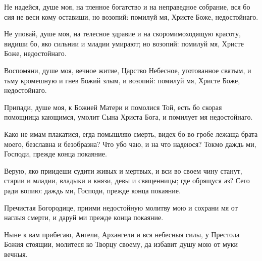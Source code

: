 \begin{mymulticols}
Не надейся, душе моя, на тленное богатство и на неправедное собрание, вся бо сия не веси кому оставиши, но возопий: помилуй мя, Христе Боже, недостойнаго.


Не уповай, душе моя, на телесное здравие и на скоромимоходящую красоту, видиши бо, яко сильнии и младии умирают; но возопий: помилуй мя, Христе Боже, недостойнаго.

\slava

Воспомяни, душе моя, вечное житие, Царство Небесное, уготованное святым, и тьму кромешную и гнев Божий злым, и возопий: помилуй мя, Христе Боже, недостойнаго.

\inyne

Припади, душе моя, к Божией Матери и помолися Той, есть бо скорая помощница кающимся, умолит Сына Христа Бога, и помилует мя недостойнаго.




Како не имам плакатися, егда помышляю смерть, видех бо во гробе лежаща брата моего, безславна и безобразна? Что убо чаю, и на что надеюся? Токмо даждь ми, Господи, прежде конца покаяние. 

\slava

Верую, яко приидеши судити живых и мертвых, и вси во своем чину станут, старии и младии, владыки и князи, девы и священницы; где обрящуся аз? Сего ради вопию: даждь ми, Господи, прежде конца покаяние.

\inyne

Пречистая Богородице, приими недостойную молитву мою и сохрани мя от наглыя смерти, и даруй ми прежде конца покаяние.




Ныне к вам прибегаю, Ангели, Архангели и вся небесныя силы, у Престола Божия стоящии, молитеся ко Творцу своему, да избавит душу мою от муки вечныя.


\end{mymulticols}
